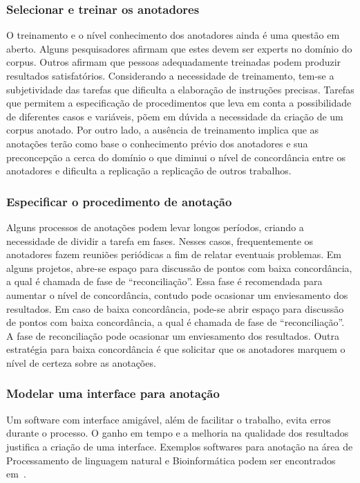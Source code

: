 

\subsubsection{Selecionar e treinar os anotadores}

O treinamento e o nível conhecimento dos anotadores ainda é uma questão em aberto. Alguns pesquisadores afirmam que estes devem ser experts no domínio do corpus. Outros afirmam que pessoas adequadamente treinadas podem produzir resultados satisfatórios. 
Considerando a necessidade de treinamento, tem-se a subjetividade das tarefas que dificulta a elaboração de instruções precisas. Tarefas que permitem a especificação de procedimentos que leva em conta a possibilidade de diferentes casos e variáveis, põem em dúvida a necessidade da criação de um corpus anotado.
Por outro lado, a ausência de treinamento implica que as anotações terão como base o conhecimento prévio dos anotadores e sua preconcepção a cerca do domínio o que diminui o nível de concordância entre os anotadores e dificulta a replicação a replicação de outros trabalhos.


\subsubsection{Especificar o procedimento de anotação}
Alguns processos de anotações podem levar longos períodos, criando a necessidade de dividir a tarefa em fases. Nesses casos, frequentemente os anotadores fazem reuniões periódicas a fim de relatar eventuais problemas.  
Em alguns projetos, abre-se espaço para discussão de pontos com baixa concordância, a qual é chamada de fase de ``reconciliação''. Essa fase é recomendada para aumentar o nível de concordância, contudo pode ocasionar um enviesamento dos resultados. 
Em caso de baixa concordância, pode-se abrir espaço para discussão de pontos com baixa concordância, a qual é chamada de fase de ``reconciliação''. A fase de reconciliação pode ocasionar um enviesamento dos resultados. Outra estratégia para baixa concordância é que solicitar que os anotadores marquem o nível de certeza sobre as anotações.

\subsubsection{Modelar uma interface para anotação}
Um software com interface amigável, além de facilitar o trabalho, evita erros durante o processo. 
O ganho em tempo e a melhoria na qualidade dos resultados justifica a criação de uma interface. 
Exemplos softwares para anotação na área de Processamento de linguagem natural e Bioinformática podem ser encontrados em~\cite{Gruenstein2007}.



